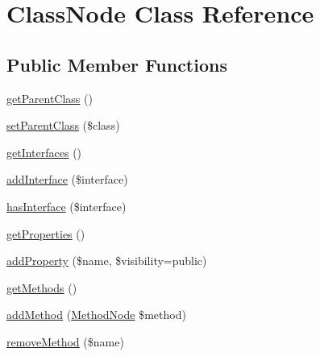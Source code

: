 \hypertarget{class_prophecy_1_1_doubler_1_1_generator_1_1_node_1_1_class_node}{}\section{Class\+Node Class Reference}
\label{class_prophecy_1_1_doubler_1_1_generator_1_1_node_1_1_class_node}
\subsection*{Public Member Functions}
\begin{DoxyCompactItemize}
\item 
\mbox{\hyperlink{class_prophecy_1_1_doubler_1_1_generator_1_1_node_1_1_class_node_a0102234be653614459dc1588c13d6f2e}{get\+Parent\+Class}} ()
\item 
\mbox{\hyperlink{class_prophecy_1_1_doubler_1_1_generator_1_1_node_1_1_class_node_a36c45e1400b3e0404a90bfa058ef8019}{set\+Parent\+Class}} (\$class)
\item 
\mbox{\hyperlink{class_prophecy_1_1_doubler_1_1_generator_1_1_node_1_1_class_node_aacd41ad982fee4953d8ad245ab7e4ec9}{get\+Interfaces}} ()
\item 
\mbox{\hyperlink{class_prophecy_1_1_doubler_1_1_generator_1_1_node_1_1_class_node_a8ee340e93f5c12065057df00a3b37e3a}{add\+Interface}} (\$interface)
\item 
\mbox{\hyperlink{class_prophecy_1_1_doubler_1_1_generator_1_1_node_1_1_class_node_a514646f4edabb77d195e2de5b7a482a1}{has\+Interface}} (\$interface)
\item 
\mbox{\hyperlink{class_prophecy_1_1_doubler_1_1_generator_1_1_node_1_1_class_node_ad92c14b6c86304d3f1fb86b2936d3408}{get\+Properties}} ()
\item 
\mbox{\hyperlink{class_prophecy_1_1_doubler_1_1_generator_1_1_node_1_1_class_node_a2b7ee41dea31bf84d61679decada4db6}{add\+Property}} (\$name, \$visibility=\textquotesingle{}public\textquotesingle{})
\item 
\mbox{\hyperlink{class_prophecy_1_1_doubler_1_1_generator_1_1_node_1_1_class_node_ab8fcebfba8c498f2190941f7ebf62da8}{get\+Methods}} ()
\item 
\mbox{\hyperlink{class_prophecy_1_1_doubler_1_1_generator_1_1_node_1_1_class_node_a4fdf44a257413de96a8444168c483d14}{add\+Method}} (\mbox{\hyperlink{class_prophecy_1_1_doubler_1_1_generator_1_1_node_1_1_method_node}{Method\+Node}} \$method)
\item 
\mbox{\hyperlink{class_prophecy_1_1_doubler_1_1_generator_1_1_node_1_1_class_node_ae19cd258a5a0cf83ffbac5fa5a0b24fa}{remove\+Method}} (\$name)

\end{DoxyCompactItemize}
